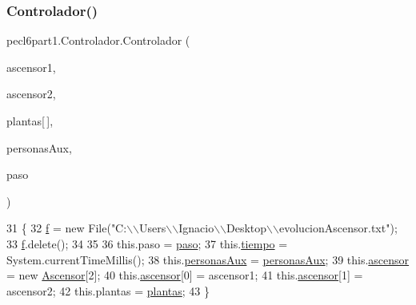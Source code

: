 \subsubsection{\texorpdfstring{Controlador()}{Controlador()}}
{\footnotesize\ttfamily pecl6part1.\+Controlador.\+Controlador (\begin{DoxyParamCaption}\item[{\mbox{\hyperlink{classpecl6part1_1_1_ascensor}{Ascensor}}}]{ascensor1,  }\item[{\mbox{\hyperlink{classpecl6part1_1_1_ascensor}{Ascensor}}}]{ascensor2,  }\item[{\mbox{\hyperlink{classpecl6part1_1_1_planta}{Planta}}}]{plantas\mbox{[}$\,$\mbox{]},  }\item[{Array\+List$<$ \mbox{\hyperlink{classpecl6part1_1_1_persona}{Persona}} $>$}]{personas\+Aux,  }\item[{\mbox{\hyperlink{classpecl6part1_1_1_monitor}{Monitor}}}]{paso }\end{DoxyParamCaption})\hspace{0.3cm}{\ttfamily [inline]}}


\begin{DoxyCode}
31     \{
32         \mbox{\hyperlink{classpecl6part1_1_1_controlador_a105bb0bb218c9e351cc76ddcb259a426}{f}} = \textcolor{keyword}{new} File(\textcolor{stringliteral}{"C:\(\backslash\)\(\backslash\)Users\(\backslash\)\(\backslash\)Ignacio\(\backslash\)\(\backslash\)Desktop\(\backslash\)\(\backslash\)evolucionAscensor.txt"});
33         \mbox{\hyperlink{classpecl6part1_1_1_controlador_a105bb0bb218c9e351cc76ddcb259a426}{f}}.delete();
34             
35         
36         this.paso = \mbox{\hyperlink{classpecl6part1_1_1_controlador_af51f3a80f264d4175c0381f8b5e8edc0}{paso}};
37         this.\mbox{\hyperlink{classpecl6part1_1_1_controlador_a2c971f9177446bce4a9d77472fedb100}{tiempo}} = System.currentTimeMillis();
38         this.\mbox{\hyperlink{classpecl6part1_1_1_controlador_a2326908271d514b5346c7091584c0e92}{personasAux}} = \mbox{\hyperlink{classpecl6part1_1_1_controlador_a2326908271d514b5346c7091584c0e92}{personasAux}};
39         this.\mbox{\hyperlink{classpecl6part1_1_1_controlador_ab1a946290b47216d355b09da476486db}{ascensor}} = \textcolor{keyword}{new} \mbox{\hyperlink{classpecl6part1_1_1_ascensor}{Ascensor}}[2];
40         this.\mbox{\hyperlink{classpecl6part1_1_1_controlador_ab1a946290b47216d355b09da476486db}{ascensor}}[0] = ascensor1;
41         this.\mbox{\hyperlink{classpecl6part1_1_1_controlador_ab1a946290b47216d355b09da476486db}{ascensor}}[1] = ascensor2;
42         this.plantas = \mbox{\hyperlink{classpecl6part1_1_1_controlador_af8149da8845735945b38d7a29a50e397}{plantas}};
43     \}
\end{DoxyCode}


